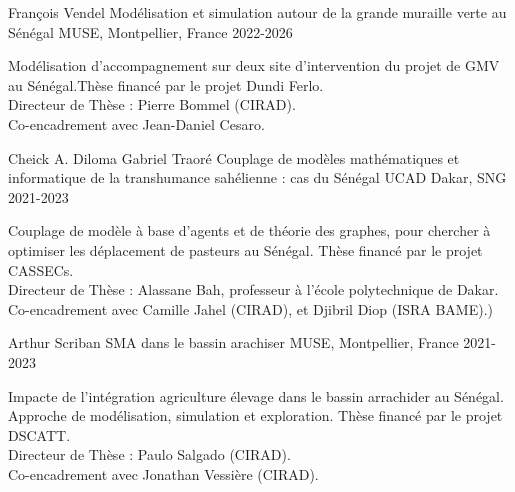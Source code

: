 
\vspace{2em}
\begin{cventries}
  
    \cventry
      {François Vendel} %
      {Modélisation et simulation autour de la grande muraille verte au Sénégal} %
      {MUSE, Montpellier, France} %
      {2022-2026} %
      {
        \begin{cvitems} %
          Modélisation d'accompagnement sur deux site d'intervention du projet de GMV au Sénégal.Thèse financé par le projet Dundi Ferlo.\\
          Directeur de Thèse : Pierre Bommel (CIRAD).\\
          Co-encadrement avec Jean-Daniel Cesaro.
        \end{cvitems}
      }
    \cventry
      {Cheick A. Diloma Gabriel Traoré} %
      {Couplage de modèles mathématiques et informatique de la transhumance sahélienne : cas du Sénégal} %
      {UCAD Dakar, SNG} %
      {2021-2023} %
      {
        \begin{cvitems} %
          Couplage de modèle à base d'agents et de théorie des graphes, pour chercher à optimiser les déplacement de pasteurs au Sénégal. Thèse financé par le projet CASSECs.\\
          Directeur de Thèse : Alassane Bah, professeur à l'école polytechnique de Dakar.\\
          Co-encadrement avec Camille Jahel (CIRAD), et Djibril Diop (ISRA BAME).)
        \end{cvitems}
      }
  
    \cventry
      {Arthur Scriban} %
      {SMA dans le bassin arachiser} %
      {MUSE, Montpellier, France} %
      {2021-2023} %
      {
        \begin{cvitems} %
         Impacte de l'intégration agriculture élevage dans le bassin arrachider au Sénégal. Approche de modélisation, simulation et exploration. Thèse financé par le projet DSCATT.\\
         Directeur de Thèse : Paulo Salgado (CIRAD).\\
         Co-encadrement avec Jonathan Vessière (CIRAD).
        \end{cvitems}
      }
    

\end{cventries}

